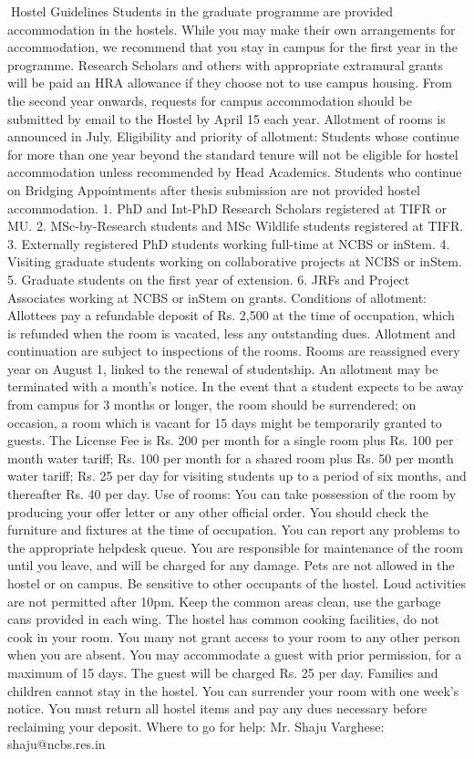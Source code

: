 \documentclass[a4paper,10pt]{article}
\begin{document}
Hostel Guidelines
Students in the graduate programme are provided accommodation in the hostels. While you
may make their own arrangements for accommodation, we recommend that you stay in
campus for the first year in the programme. Research Scholars and others with appropriate
extramural grants will be paid an HRA allowance if they choose not to use campus housing.
From the second year onwards, requests for campus accommodation should be submitted by
email to the Hostel by April 15 each year. Allotment of rooms is announced in July.
Eligibility and priority of allotment: Students whose continue for more than one year
beyond the standard tenure will not be eligible for hostel accommodation unless
recommended by Head Academics. Students who continue on Bridging Appointments after
thesis submission are not provided hostel accommodation.
1. PhD and Int-PhD Research Scholars registered at TIFR or MU.
2. MSc-by-Research students and MSc Wildlife students registered at TIFR.
3. Externally registered PhD students working full-time at NCBS or inStem.
4. Visiting graduate students working on collaborative projects at NCBS or inStem.
5. Graduate students on the first year of extension.
6. JRFs and Project Associates working at NCBS or inStem on grants.
Conditions of allotment: Allottees pay a refundable deposit of Rs. 2,500 at the time of
occupation, which is refunded when the room is vacated, less any outstanding dues.
Allotment and continuation are subject to inspections of the rooms. Rooms are reassigned
every year on August 1, linked to the renewal of studentship. An allotment may be
terminated with a month’s notice. In the event that a student expects to be away from
campus for 3 months or longer, the room should be surrendered; on occasion, a room which
is vacant for 15 days might be temporarily granted to guests. The License Fee is Rs. 200 per
month for a single room plus Rs. 100 per month water tariff; Rs. 100 per month for a shared
room plus Rs. 50 per month water tariff; Rs. 25 per day for visiting students up to a period
of six months, and thereafter Rs. 40 per day.
Use of rooms: You can take possession of the room by producing your offer letter or any
other official order. You should check the furniture and fixtures at the time of occupation.
You can report any problems to the appropriate helpdesk queue. You are responsible for
maintenance of the room until you leave, and will be charged for any damage. Pets are not
allowed in the hostel or on campus. Be sensitive to other occupants of the hostel. Loud
activities are not permitted after 10pm. Keep the common areas clean, use the garbage cans
provided in each wing. The hostel has common cooking facilities, do not cook in your room.
You many not grant access to your room to any other person when you are absent. You may
accommodate a guest with prior permission, for a maximum of 15 days. The guest will be
charged Rs. 25 per day. Families and children cannot stay in the hostel. You can surrender
your room with one week’s notice. You must return all hostel items and pay any dues
necessary before reclaiming your deposit.
Where to go for help:
Mr. Shaju Varghese: shaju@ncbs.res.in
	
\end{document}
